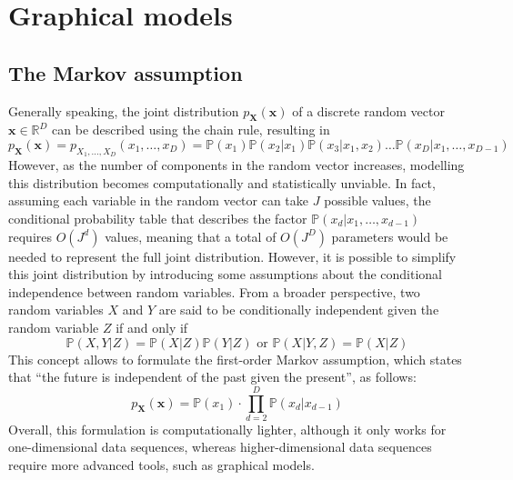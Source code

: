 \documentclass{report}
\begin{document}
\chapter{Graphical models}
\section{The Markov assumption}
Generally speaking, the joint distribution $\displaystyle p_{\mathbf{X}}(\mathbf{x})$ of a discrete random vector $\displaystyle \mathbf{x} \in \mathbb{R}^D$ can be described using the chain rule, resulting in
\[p_{\mathbf{X}}(\mathbf{x}) = p_{X_1, \dots, X_D}(x_1, \dots, x_D) = \mathbb{P}(x_1)\mathbb{P}(x_2|x_1)\mathbb{P}(x_3|x_1, x_2)\dots\mathbb{P}(x_D|x_1, \dots, x_{D - 1})\]
However, as the number of components in the random vector increases, modelling this distribution becomes computationally and statistically unviable. \newline
In fact, assuming each variable in the random vector can take $\displaystyle J$ possible values, the conditional probability table that describes the factor $\displaystyle \mathbb{P}(x_d|x_1, \dots, x_{d - 1})$ requires $\displaystyle O(J^d)$ values, meaning that a total of $\displaystyle O(J^D)$ parameters would be needed to represent the full joint distribution. \newline
However, it is possible to simplify this joint distribution by introducing some assumptions about the conditional independence between random variables. \newline
From a broader perspective, two random variables $\displaystyle X$ and $\displaystyle Y$ are said to be conditionally independent given the random variable $\displaystyle Z$ if and only if
\[\mathbb{P}(X, Y|Z) = \mathbb{P}(X|Z)\mathbb{P}(Y|Z) \text{ or } \mathbb{P}(X|Y, Z) = \mathbb{P}(X|Z)\]
This concept allows to formulate the first-order Markov assumption, which states that ``the future is independent of the past given the present'', as follows:
\[p_{\mathbf{X}}(\mathbf{x}) = \mathbb{P}(x_1) \cdot \prod_{d = 2}^D \mathbb{P}(x_d|x_{d - 1})\]
Overall, this formulation is computationally lighter, although it only works for one-dimensional data sequences, whereas higher-dimensional data sequences require more advanced tools, such as graphical models.
\end{document}
